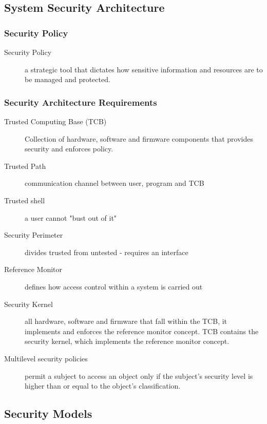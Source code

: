 \documentclass[11pt]{article}
\begin{document}
\subsection{System Security Architecture}
\label{sec:org300e186}
\subsubsection{Security Policy}
\label{sec:orga843729}
\begin{description}
\item[{Security Policy}] a strategic tool that dictates how sensitive information and resources are to be managed and protected.
\end{description}
\subsubsection{Security Architecture Requirements}
\label{sec:org12b8bc3}
\begin{description}
\item[{Trusted Computing Base (TCB)}] Collection of hardware, software and firmware components that provides security and enforces policy.
\item[{Trusted Path}] communication channel between user, program and TCB
\item[{Trusted shell}] a user cannot "bust out of it"
\item[{Security Perimeter}] divides trusted from untested - requires an interface
\item[{Reference Monitor}] defines how access control within a system is carried out
\item[{Security Kernel}] all hardware, software and firmware that fall within the TCB, it implements and enforces the reference monitor concept. TCB contains the security kernel, which implements the reference monitor concept.
\item[{Multilevel security policies}] permit a subject to access an object only if the subject's security level is higher than or equal to the object's classification.
\end{description}
\subsection{Security Models}
\label{sec:org901df2e}
\end{document}
